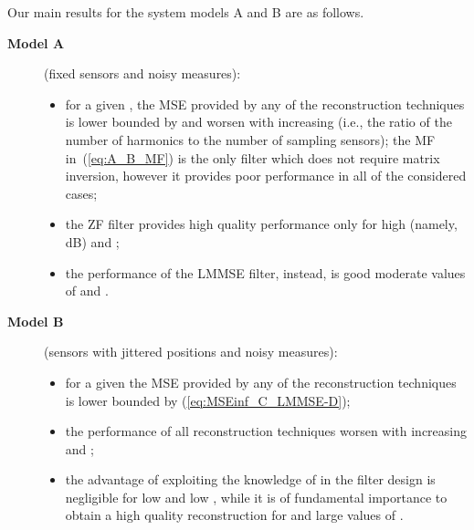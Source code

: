 \documentclass[final, a4paper]{IEEEtran}
\begin{document}
Our main results for the system models A and B are as follows.
\begin{description}
\item[{\bf Model A}] \hspace{0.7cm} (fixed sensors and noisy measures):
\begin{itemize}
\item  for a given , the MSE provided by any of the reconstruction techniques
is lower bounded by  and worsen with increasing
 (i.e., the ratio of the number of harmonics
 to the number of sampling sensors);
the MF in~(\ref{eq:A_B_MF}) is the only filter which
does not require matrix inversion,
however it provides poor performance in all of the considered cases;
\item the ZF filter
provides high quality performance only
for high  (namely, \,dB) and ;
\item the performance of the LMMSE filter, instead,
is good moderate values of  and .
\end{itemize}

\item[{\bf  Model B}] \hspace{0.7cm} (sensors with jittered positions and noisy measures):
\begin{itemize}
\item for a given  the MSE provided by any of the reconstruction techniques
is lower bounded by (\ref{eq:MSEinf_C_LMMSE-D});
\item the performance of all reconstruction techniques worsen with
increasing  and ;
\item the advantage of exploiting the knowledge of 
in the filter design is negligible for low  and low ,
while it is of fundamental importance to obtain a high
quality reconstruction for  and large values of .

\end{itemize}
\end{description}
\end{document}
